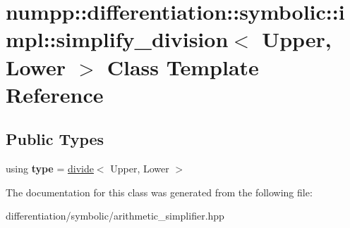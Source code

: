 \hypertarget{classnumpp_1_1differentiation_1_1symbolic_1_1impl_1_1simplify__division}{}\section{numpp\+:\+:differentiation\+:\+:symbolic\+:\+:impl\+:\+:simplify\+\_\+division$<$ Upper, Lower $>$ Class Template Reference}
\label{classnumpp_1_1differentiation_1_1symbolic_1_1impl_1_1simplify__division}
\subsection*{Public Types}
\begin{DoxyCompactItemize}
\item 
\mbox{\label{classnumpp_1_1differentiation_1_1symbolic_1_1impl_1_1simplify__division_ae2f652131fcea65854e95da311fc2854}} 
using {\bfseries type} = \hyperlink{classnumpp_1_1differentiation_1_1symbolic_1_1divide}{divide}$<$ Upper, Lower $>$
\end{DoxyCompactItemize}


The documentation for this class was generated from the following file\+:\begin{DoxyCompactItemize}
\item 
differentiation/symbolic/arithmetic\+\_\+simplifier.\+hpp\end{DoxyCompactItemize}
